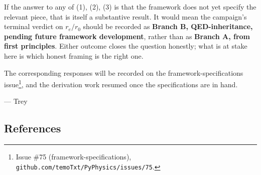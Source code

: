 \documentclass[
  11pt,
]{article}
\begin{document}
If the answer to any of (1), (2), (3) is that the framework does not yet
specify the relevant piece, that is itself a substantive result. It
would mean the campaign's terminal verdict on \(r_e/r_0\) should be
recorded as \textbf{Branch B, QED-inheritance, pending future framework
development}, rather than as \textbf{Branch A, from first principles}.
Either outcome closes the question honestly; what is at stake here is
which honest framing is the right one.

The corresponding responses will be recorded on the
framework-specifications issue\footnote{Issue \#75
  (framework-specifications),
  \texttt{github.com/temoTxt/PyPhysics/issues/75}.}, and the derivation
work resumed once the specifications are in hand.

--- Trey

\hypertarget{references}{%
\subsection{References}\label{references}}
\end{document}
